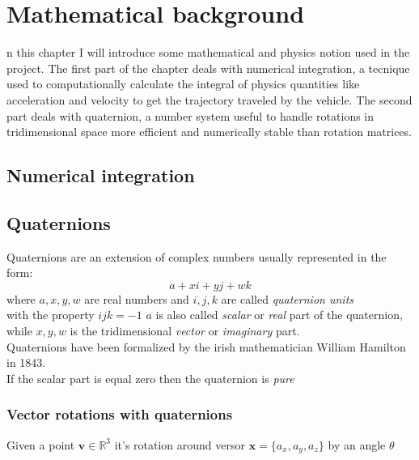 \let\textcircled=\pgftextcircled
\chapter{Mathematical background}
\label{chap:math_background}

n this chapter I will introduce some mathematical and physics notion used in the project.
The first part of the chapter deals with numerical integration, a tecnique used to computationally calculate the integral of physics quantities like acceleration and velocity to get the trajectory traveled by the vehicle.
The second part deals with quaternion, a number system useful to handle rotations in tridimensional space more efficient and numerically stable than rotation matrices.

\section{Numerical integration}

\section{Quaternions}
Quaternions are an extension of complex numbers usually represented in the form:
$$ a + xi + yj + wk $$
where $a, x, y, w$ are real numbers and $i, j, k$ are called \textit{quaternion units} \\
with the property ${ijk=-1}$
$a$ is also called \textit{scalar} or \textit{real} part of the quaternion, while $x,y,w$ is the tridimensional \textit{vector} or \textit{imaginary} part. \\
Quaternions have been formalized by the irish mathematician William Hamilton in 1843. \\
If the scalar part is equal zero then the quaternion is \textit{pure} \\

\subsection{Vector rotations with quaternions}
Given a point $\boldsymbol{v} \in \mathbb{R}^3$ it's rotation around versor $\boldsymbol{x}=\{a_x, a_y, a_z\}$ by an angle $\theta$